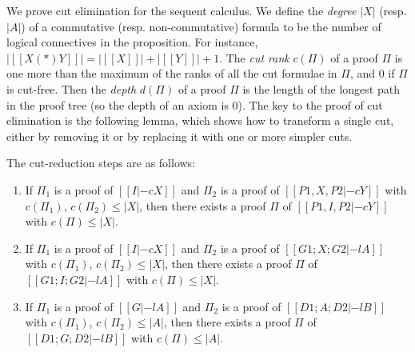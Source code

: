 We prove cut elimination for the sequent calculus. We define the
\textit{degree} $|X|$ (resp. $|A|$) of a commutative (resp. non-commutative)
formula to be the number of logical connectives in the proposition. For
instance, $|[[X (*) Y]]| = |[[X]]| + |[[Y]]| + 1$. The \textit{cut rank}
$c(\Pi)$ of a proof $\Pi$ is one more than the maximum of the ranks of all
the cut formulae in $\Pi$, and $0$ if $\Pi$ is cut-free. Then the
\textit{depth} $d(\Pi)$ of a proof $\Pi$ is the length of the longest path
in the proof tree (so the depth of an axiom is $0$). The key to the proof
of cut elimination is the following lemma, which shows how to transform a
single cut, either by removing it or by replacing it with one or more
simpler cuts.
\begin{lemma}
  \label{lem:cut-reduction}
  The cut-reduction steps are as follows:
  \begin{enumerate}
  \item If $\Pi_1$ is a proof of $[[I |-c X]]$ and $\Pi_2$ is a proof of
  $[[P1,X,P2 |-c Y]]$ with $c(\Pi_1)$, $c(\Pi_2)\leq |X|$, then there exists
  a proof $\Pi$ of $[[P1, I, P2 |-c Y]]$ with $c(\Pi)\leq |X|$.
  \item If $\Pi_1$ is a proof of $[[I |-c X]]$ and $\Pi_2$ is a proof of
  $[[G1; X; G2 |-l A]]$ with $c(\Pi_1)$, $c(\Pi_2)\leq |X|$, then there
  exists a proof $\Pi$ of $[[G1; I; G2 |-l A]]$ with $c(\Pi)\leq |X|$.
  \item If $\Pi_1$ is a proof of $[[G |-l A]]$ and $\Pi_2$ is a proof of
  $[[D1; A; D2 |-l B]]$ with $c(\Pi_1)$, $c(\Pi_2)\leq |A|$, then there
  exists a proof $\Pi$ of $[[D1; G; D2 |-l B]]$ with $c(\Pi)\leq |A|$.
  \end{enumerate}
\end{lemma}
